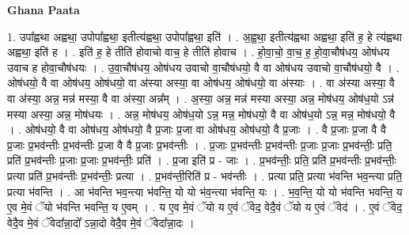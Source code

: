 \documentclass[17pt]{extarticle}
\begin{document}
\textbf{Ghana Paata } \newline

1. उपा᳚ह्वथा अह्वथा॒ उपोपा᳚ह्वथा॒ इतीत्य॑ह्वथा॒ उपोपा᳚ह्वथा॒ इति॑ । . अ॒ह्व॒था॒ इतीत्य॑ह्वथा अह्वथा॒ इति॑ ह॒ हे त्य॑ह्वथा अह्वथा॒ इति॑ ह । . इति॑ ह॒ हे तीति॑ होवाचो वाच॒ हे तीति॑ होवाच । . हो॒वा॒चो॒ वा॒च॒ ह॒ हो॒वा॒चौष॑धय॒ ओष॑धय उवाच ह होवा॒चौष॑धयः । . उ॒वा॒चौष॑धय॒ ओष॑धय उवाचो वा॒चौष॑धयो॒ वै वा ओष॑धय उवाचो वा॒चौष॑धयो॒ वै । . ओष॑धयो॒ वै वा ओष॑धय॒ ओष॑धयो॒ वा अ॑स्या अस्या॒ वा ओष॑धय॒ ओष॑धयो॒ वा अ॑स्याः । . वा अ॑स्या अस्या॒ वै वा अ॑स्या॒ अन्न॒ मन्न॑ मस्या॒ वै वा अ॑स्या॒ अन्न᳚म् । . अ॒स्या॒ अन्न॒ मन्न॑ मस्या अस्या॒ अन्न॒ मोष॑धय॒ ओष॑ध॒यो ऽन्न॑ मस्या अस्या॒ अन्न॒ मोष॑धयः । . अन्न॒ मोष॑धय॒ ओष॑ध॒यो ऽन्न॒ मन्न॒ मोष॑धयो॒ वै वा ओष॑ध॒यो ऽन्न॒ मन्न॒ मोष॑धयो॒ वै । . ओष॑धयो॒ वै वा ओष॑धय॒ ओष॑धयो॒ वै प्र॒जाः प्र॒जा वा ओष॑धय॒ ओष॑धयो॒ वै प्र॒जाः । . वै प्र॒जाः प्र॒जा वै वै प्र॒जाः प्र॒भव॑न्तीः प्र॒भव॑न्तीः प्र॒जा वै वै प्र॒जाः प्र॒भव॑न्तीः । . प्र॒जाः प्र॒भव॑न्तीः प्र॒भव॑न्तीः प्र॒जाः प्र॒जाः प्र॒भव॑न्तीः॒ प्रति॒ प्रति॑ प्र॒भव॑न्तीः प्र॒जाः प्र॒जाः प्र॒भव॑न्तीः॒ प्रति॑ । . प्र॒जा इति॑ प्र - जाः । . प्र॒भव॑न्तीः॒ प्रति॒ प्रति॑ प्र॒भव॑न्तीः प्र॒भव॑न्तीः॒ प्रत्या प्रति॑ प्र॒भव॑न्तीः प्र॒भव॑न्तीः॒ प्रत्या । . प्र॒भव॑न्ती॒रिति॑ प्र - भव॑न्तीः । . प्रत्या प्रति॒ प्रत्या भ॑वन्ति भव॒न्त्या प्रति॒ प्रत्या भ॑वन्ति । . आ भ॑वन्ति भव॒न्त्या भ॑वन्ति॒ यो यो भ॑व॒न्त्या भ॑वन्ति॒ यः । . भ॒व॒न्ति॒ यो यो भ॑वन्ति भवन्ति॒ य ए॒व मे॒वं ॅयो भ॑वन्ति भवन्ति॒ य ए॒वम् । . य ए॒व मे॒वं ॅयो य ए॒वं ॅवेद॒ वेदै॒वं ॅयो य ए॒वं ॅवेद॑ । . ए॒वं ॅवेद॒ वेदै॒व मे॒वं ॅवेदा᳚न्ना॒दो᳚ ऽन्ना॒दो वेदै॒व मे॒वं ॅवेदा᳚न्ना॒दः । \newline
\end{document}
